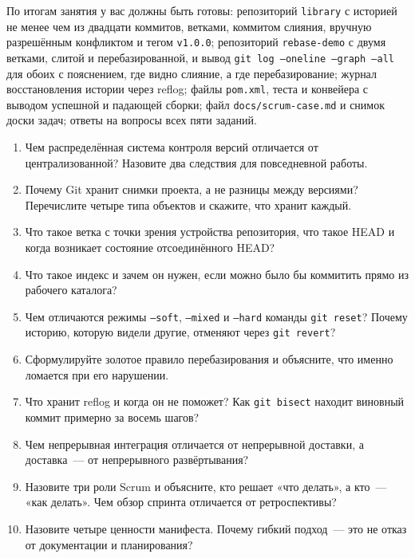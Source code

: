 По итогам занятия у вас должны быть готовы: репозиторий \texttt{library} с историей не менее чем из двадцати коммитов, ветками, коммитом слияния, вручную разрешённым конфликтом и тегом \texttt{v1.0.0}; репозиторий \texttt{rebase-demo} с двумя ветками, слитой и перебазированной, и вывод \texttt{git log --oneline --graph --all} для обоих с пояснением, где видно слияние, а где перебазирование; журнал восстановления истории через reflog; файлы \texttt{pom.xml}, теста и конвейера с выводом успешной и падающей сборки; файл \texttt{docs/scrum-case.md} и снимок доски задач; ответы на вопросы всех пяти заданий.

\kontrolvoprosy

\begin{enumerate}
\item Чем распределённая система контроля версий отличается от
      централизованной? Назовите два следствия для повседневной работы.
\item Почему Git хранит снимки проекта, а не разницы между версиями?
      Перечислите четыре типа объектов и скажите, что хранит каждый.
\item Что такое ветка с точки зрения устройства репозитория, что такое HEAD и
      когда возникает состояние отсоединённого HEAD?
\item Что такое индекс и зачем он нужен, если можно было бы коммитить прямо из
      рабочего каталога?
\item Чем отличаются режимы \texttt{--soft}, \texttt{--mixed} и \texttt{--hard}
      команды \texttt{git reset}? Почему историю, которую видели другие,
      отменяют через \texttt{git revert}?
\item Сформулируйте золотое правило перебазирования и объясните, что именно
      ломается при его нарушении.
\item Что хранит reflog и когда он не поможет? Как \texttt{git bisect} находит
      виновный коммит примерно за восемь шагов?
\item Чем непрерывная интеграция отличается от непрерывной доставки, а
      доставка~--- от непрерывного развёртывания?
\item Назовите три роли Scrum и объясните, кто решает «что делать», а кто~---
      «как делать». Чем обзор спринта отличается от ретроспективы?
\item Назовите четыре ценности манифеста. Почему гибкий подход~--- это не отказ
      от документации и планирования?
\end{enumerate}

\testzadaniya

